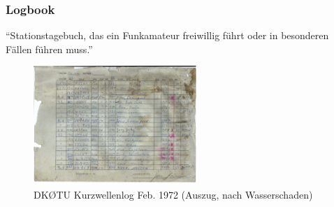 \begin{frame}
  \frametitle{Logbook}

  ``Stationstagebuch, das ein Funkamateur freiwillig führt oder in besonderen
  Fällen führen muss.''

  \begin{center}
    \begin{figure}
      \includegraphics[width=0.55\textwidth,height=.7\textheight,keepaspectratio]{bv13/DK0TU_LOG_KW_1972-02_Auszug.jpg}
      \caption{DKØTU Kurzwellenlog Feb. 1972 (Auszug, nach Wasserschaden)}
    \end{figure}
  \end{center}

\end{frame}

